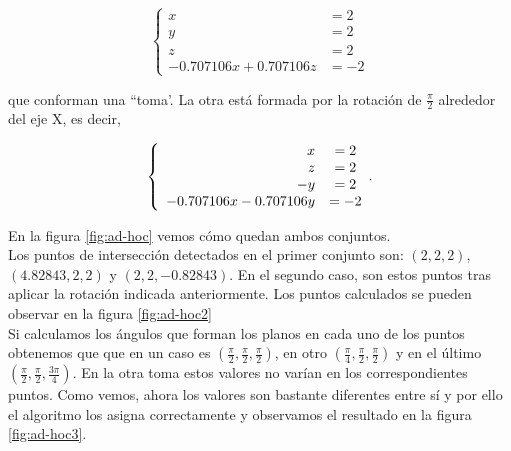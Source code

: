 \[
\left\{
\begin{array}{rcl}
x &= 2\\ 
y &= 2\\
z &= 2\\
-0.707106x + 0.707106z &= -2
\end{array}
\right.
\]

que conforman una ``toma'. La otra está formada por la rotación de $ \frac{\pi}{2} $ alrededor del eje X, es decir,

\[\\
\left\{
\begin{array}{rcl}
x &= 2\\
z &= 2\\
-y & = 2\\
-0.707106x - 0.707106y &= -2
\end{array}.
\right. 
\]

En la figura \ref{fig:ad-hoc} vemos cómo quedan ambos conjuntos. \\


Los puntos de intersección detectados en el primer conjunto son: $ (2,2,2) $, $ (4.82843,2,2) $ y $ (2,2,-0.82843) $. En el segundo caso, son estos puntos tras aplicar la rotación indicada anteriormente. Los puntos calculados se pueden observar en la figura \ref{fig:ad-hoc2}\\


Si calculamos los ángulos que forman los planos en cada uno de los puntos obtenemos que que en un caso es $ (\frac{\pi}{2}, \frac{\pi}{2}, \frac{\pi}{2}) $, en otro $ (\frac{\pi}{4}, \frac{\pi}{2}, \frac{\pi}{2}) $ y en el último $ (\frac{\pi}{2}, \frac{\pi}{2}, \frac{3\pi}{4}) $. En la otra toma estos valores no varían en los correspondientes puntos. Como vemos, ahora los valores son bastante diferentes entre sí y por ello el algoritmo los asigna correctamente y observamos el resultado en la figura \ref{fig:ad-hoc3}. \\

